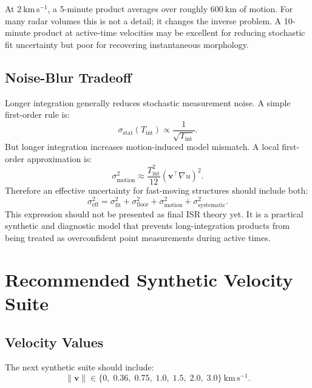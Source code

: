 \documentclass[11pt]{article}
\newcommand{\kmps}{\mathrm{km\,s^{-1}}}
\begin{document}
At $2~\kmps$, a 5-minute product averages over roughly $600~\mathrm{km}$ of motion. For many
radar volumes this is not a detail; it changes the inverse problem. A 10-minute product at
active-time velocities may be excellent for reducing stochastic fit uncertainty but poor for recovering
instantaneous morphology.

\subsection{Noise-Blur Tradeoff}

Longer integration generally reduces stochastic measurement noise. A simple first-order rule is:
\begin{equation}
  \sigma_{\mathrm{stat}}(T_{\mathrm{int}})
  \propto
  \frac{1}{\sqrt{T_{\mathrm{int}}}}.
\end{equation}
But longer integration increases motion-induced model mismatch. A local first-order approximation
is:
\begin{equation}
  \sigma_{\mathrm{motion}}^2
  \approx
  \frac{T_{\mathrm{int}}^2}{12}
  \left(\mathbf{v}^{\top}\nabla u\right)^2.
\end{equation}
Therefore an effective uncertainty for fast-moving structures should include both:
\begin{equation}
  \sigma_{\mathrm{eff}}^2
  =
  \sigma_{\mathrm{fit}}^2
  +
  \sigma_{\mathrm{floor}}^2
  +
  \sigma_{\mathrm{motion}}^2
  +
  \sigma_{\mathrm{systematic}}^2.
\end{equation}
This expression should not be presented as final ISR theory yet. It is a practical synthetic and
diagnostic model that prevents long-integration products from being treated as overconfident point
measurements during active times.

\section{Recommended Synthetic Velocity Suite}

\subsection{Velocity Values}

The next synthetic suite should include:
\begin{equation}
  \|\mathbf{v}\| \in
  \{0,\;0.36,\;0.75,\;1.0,\;1.5,\;2.0,\;3.0\}~\kmps.
\end{equation}
\end{document}
